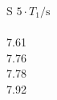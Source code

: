 \begin{minipage}{0.49\textwidth}
 \centering
 \begin{tabular}{S }
 \toprule
${5} \cdot T_{1}/ \si{\second}$ \\
 \\
 7.61 \\
 7.76 \\
 7.78 \\
 7.92 \\
 \bottomrule
 \end{tabular}
 \label{tab:T_links_60}
  \end{minipage}
